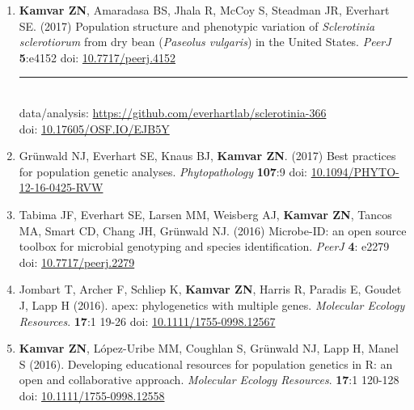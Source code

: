 \begin{enumerate}[leftmargin = 14pt]

	\item \textbf{Kamvar ZN}, Amaradasa BS, Jhala R, McCoy S, Steadman JR,
	Everhart SE. (2017) Population structure and phenotypic variation of
	\textit{Sclerotinia sclerotiorum} from dry bean (\textit{Paseolus vulgaris})
	in the United States. \textit{PeerJ} \textbf{5}:e4152 doi: \href{https://doi.org/10.7717/peerj.4152}{10.7717/peerj.4152}\\
	\rule[0.25\baselineskip]{0.25\textwidth}{0.5pt}\\
	data/analysis: \href{https://github.com/everhartlab/sclerotinia-366#readme}{https://github.com/everhartlab/sclerotinia-366}\\
	doi:\phantom{t/analysis:}
	\href{https://doi.org/10.17605/OSF.IO/EJB5Y}{10.17605/OSF.IO/EJB5Y}

	\vspace{3pt}

	\item Gr\"unwald NJ, Everhart SE, Knaus BJ, \textbf{Kamvar ZN}. (2017)
	Best practices for population genetic analyses. \textit{Phytopathology}
	\textbf{107}:9 doi: \href{http://doi.org/10.1094/PHYTO-12-16-0425-RVW}{10.1094/PHYTO-12-16-0425-RVW}

	\vspace{3pt}

	\item Tabima JF, Everhart SE, Larsen MM, Weisberg AJ, \textbf{Kamvar ZN}, Tancos MA,
	Smart CD, Chang JH, Gr\"unwald NJ. (2016) Microbe-ID: an open source toolbox
	for microbial genotyping and species identification. \textit{PeerJ} \textbf{4}: e2279
	doi: \href{https://doi.org/10.7717/peerj.2279}{10.7717/peerj.2279}

	\vspace{3pt}

	\item Jombart T, Archer F, Schliep K, \textbf{Kamvar ZN}, Harris R, Paradis
	E, Goudet J, Lapp H (2016). apex: phylogenetics with multiple genes.
	\textit{Molecular Ecology Resources}. \textbf{17}:1 19-26 doi:
	\href{http://doi.org/10.1111/1755-0998.12567}{10.1111/1755-0998.12567}

	\vspace{3pt}

	\item \textbf{Kamvar ZN}, L\'opez-Uribe MM, Coughlan S, Gr\"unwald NJ, Lapp
	H, Manel S (2016). Developing educational resources for population genetics
	in R: an open and collaborative approach. \textit{Molecular Ecology Resources}.
	\textbf{17}:1 120-128 doi:
	\href{http://doi.org/10.1111/1755-0998.12558}{10.1111/1755-0998.12558}


\end{enumerate}
